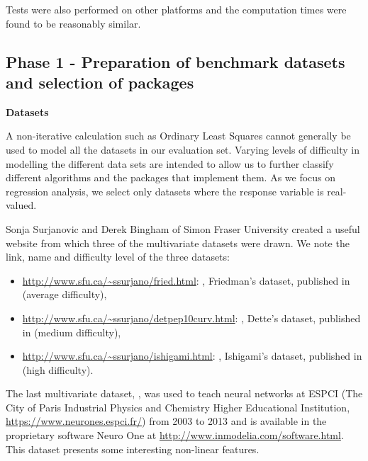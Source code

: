 Tests were also performed on other platforms and the computation times
were found to be reasonably similar.

\hypertarget{phase-1---preparation-of-benchmark-datasets-and-selection-of-packages}{%
\subsection{Phase 1 - Preparation of benchmark datasets and selection of
packages}\label{phase-1---preparation-of-benchmark-datasets-and-selection-of-packages}}

\textbf{Datasets}

A non-iterative calculation such as Ordinary Least Squares cannot
generally be used to model all the datasets in our evaluation set.
Varying levels of difficulty in modelling the different data sets are
intended to allow us to further classify different algorithms and the
packages that implement them. As we focus on regression analysis, we
select only datasets where the response variable is real-valued.

Sonja Surjanovic and Derek Bingham of Simon Fraser University created a
useful website from which three of the multivariate datasets were drawn.
We note the link, name and difficulty level of the three datasets:

\begin{itemize}
\tightlist
\item
  \url{http://www.sfu.ca/~ssurjano/fried.html}: ,
  Friedman's dataset, published in \citep{friedman91} (average
  difficulty),\\
\item
  \url{http://www.sfu.ca/~ssurjano/detpep10curv.html}: ,
  Dette's dataset, published in \citep{dettePepelyshev10} (medium
  difficulty),\\
\item
  \url{http://www.sfu.ca/~ssurjano/ishigami.html}: ,
  Ishigami's dataset, published in \citep{ishigamietal90} (high
  difficulty).
\end{itemize}

The last multivariate dataset, , was used to teach neural
networks at ESPCI (The City of Paris Industrial Physics and Chemistry
Higher Educational Institution, \url{https://www.neurones.espci.fr/})
from 2003 to 2013 and is available in the proprietary software Neuro One
at \url{http://www.inmodelia.com/software.html}. This dataset presents
some interesting non-linear features.

